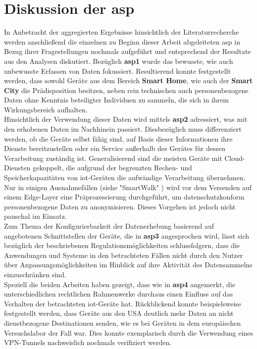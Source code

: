 
\section{Diskussion der \acl{asp}}
\label{sec:Hauptteil:ssec:Diskussion der Aspekte}

In Anbetracht der aggregierten Ergebnisse hinsichtlich der Literaturrecherche werden anschließend die einzelnen zu Beginn dieser Arbeit abgeleiteten \ac{asp} in Bezug ihrer Fragestellungen nochmals aufgeführt und entsprechend der Resultate aus den Analysen diskutiert. Bezüglich \textbf{\ac{asp}1} wurde das bewusste, wie auch unbewusste Erfassen von Daten fokussiert. Resultierend konnte festgestellt werden, dass sowohl Geräte aus dem Bereich \textbf{Smart Home}, wie auch der \textbf{Smart City} die Prädisposition besitzen, neben rein technischen auch personenbezogene Daten ohne Kenntnis beteiligter Individuen zu sammeln, die sich in ihrem Wirkungsbereich aufhalten.\\
Hinsichtlich der Verwendung dieser Daten wird mittels \textbf{\ac{asp}2} adressiert, was mit den erhobenen Daten im Nachhinein passiert. Diesbezüglich muss differenziert werden, ob die Geräte selbst fähig sind, auf Basis dieser Informationen ihre Dienste bereitzustellen oder ein Service außerhalb des Gerätes für dessen Verarbeitung zuständig ist. Generalisierend sind die meisten Geräte mit Cloud-Diensten gekoppelt, die aufgrund der begrenzten Rechen- und Speicherkapazitäten von \ac{iot}-Geräten die aufwändige Verarbeitung übernehmen. Nur in einigen Ausnahmefällen (siehe "SmartWalk" \cite{Natix2022}) wird vor dem Versenden auf einem Edge-Layer eine Präprozessierung durchgeführt, um datenschutzkonform personenbezogene Daten zu anonymisieren. Dieses Vorgehen ist jedoch nicht pauschal im Einsatz.\\
Zum Thema der Konfigurierbarkeit der Datenerhebung basierend auf angebotenen Schnittstellen der Geräte, die in \textbf{\ac{asp}3} angesprochen wird, lässt sich bezüglich der beschriebenen Regulationsmöglichkeiten schlussfolgern, dass die Anwendungen und Systeme in den betrachteten Fällen nicht durch den Nutzer über Anpassungsmöglichkeiten im Hinblick auf ihre Aktivität des Datensammelns einzuschränken sind.\\
Speziell die beiden Arbeiten \cite{Mandalari2021,Ren2019} haben gezeigt, dass wie in \textbf{\ac{asp}4} angemerkt, die unterschiedlichen rechtlichen Rahmenwerke durchaus einen Einfluss auf das Verhalten der betrachteten \ac{iot}-Geräte hat. Rückblickend konnte beispielsweise festgestellt werden, dass Geräte aus den USA deutlich mehr Daten an nicht dienstbezogene Destinationen senden, wie es bei Geräten in dem europäischen Versuchslabor der Fall war. Dies konnte exemplarisch durch die Verwendung eines VPN-Tunnels nachweislich nochmals verifiziert werden.\\
